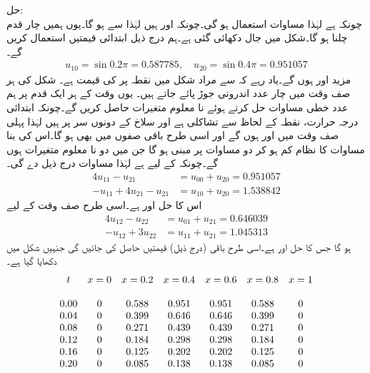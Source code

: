 حل:\quad {}\\
چونکہ  ہے لہٰذا مساوات  استعمال ہو گی۔چونکہ  اور  ہیں لہٰذا  سے  ہو گا۔یوں ہمیں چار قدم چلنا ہو گا۔شکل  میں جال دکھائی گئی ہے۔ہم درج ذیل ابتدائی قیمتیں استعمال کریں گے۔
\begin{align*}
u_{10}=\sin 0.2\pi=\num{0.587785},\quad u_{20}=\sin 0.4\pi=\num{0.951057}
\end{align*}
مزید  اور  ہوں گے۔یاد رہے کہ  سے مراد شکل  میں نقطہ  پر  کی قیمت ہے۔ شکل کی ہر صف وقت میں چار عدد اندرونی جوڑ پائے جاتے ہیں۔ یوں وقت کے ہر ایک قدم پر ہم  عدد خطی مساوات حل کرتے ہوئے   نا معلوم متغیرات حاصل کریں گے۔چونکہ ابتدائی درجہ حرارت، نقطہ  کے لحاظ سے تشاکلی ہے اور سلاخ کے دونوں سر  پر ہیں لہٰذا پہلی صف وقت میں  اور  ہوں گے اور اسی طرح باقی صفوں میں بھی ہو گا۔اس کی بنا مساوات کا نظام کم ہو کر دو مساوات پر مبنی ہو گا جن میں دو نا معلوم متغیرات ہوں گے۔چونکہ  کے لیے  ہے لہٰذا مساوات  درج ذیل دے گی۔
\begin{align*}
4u_{11}-u_{21}\phantom{+u_{32}}&=u_{00}+u_{20}=\num{0.951057}\\
-u_{11}+4u_{21}-u_{21}&=u_{10}+u_{20}=\num{1.538842}
\end{align*}
اس کا حل  اور  ہے۔اسی طرح صف وقت  کے لیے
\begin{align*}
4u_{12}-u_{22}&=u_{01}+u_{21}=\num{0.646039}\\
-u_{12}+3u_{22}&=u_{11}+u_{21}=\num{1.045313}
\end{align*}
ہو گا جس کا حل  اور  ہے۔اسی طرح باقی  (درج ذیل) قیمتیں حاصل کی جائیں گی جنہیں شکل  میں دکھایا گیا ہے۔
\begin{align*}
\centering
\begin{array}{ccccccc}
t&x=0&x=0.2&x=0.4&x=0.6&x=0.8&x=1\\
&&&&&&\\
0.00&0&0.588&0.951&0.951&0.588&0\\
0.04&0&0.399&0.646&0.646&0.399&0\\
0.08&0&0.271&0.439&0.439&0.271&0\\
0.12&0&0.184&0.298&0.298&0.184&0\\
0.16&0&0.125&0.202&0.202&0.125&0\\
0.20&0&0.085&0.138&0.138&0.085&0
\end{array}
\end{align*} 
